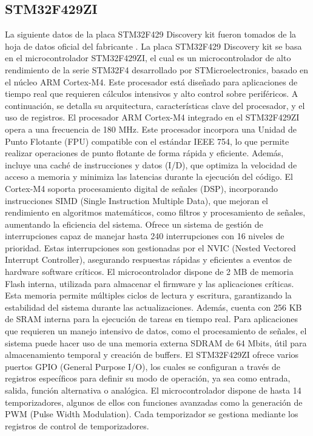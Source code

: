\subsection{STM32F429ZI}
La siguiente datos de la placa STM32F429 Discovery kit fueron tomados de la hoja de datos oficial del fabricante \cite{discovery}.
La placa STM32F429 Discovery kit se basa en el microcontrolador STM32F429ZI, el cual es un microcontrolador de alto rendimiento de la serie STM32F4 desarrollado por STMicroelectronics, basado en el núcleo ARM Cortex-M4. Este procesador está diseñado para aplicaciones de tiempo real que requieren cálculos intensivos y alto control sobre periféricos. A continuación, se detalla su arquitectura, características clave del procesador, y el uso de registros.
El procesador ARM Cortex-M4 integrado en el STM32F429ZI opera a una frecuencia de 180 MHz. Este procesador incorpora una Unidad de Punto Flotante (FPU) compatible con el estándar IEEE 754, lo que permite realizar operaciones de punto flotante de forma rápida y eficiente. Además, incluye una caché de instrucciones y datos (I/D), que optimiza la velocidad de acceso a memoria y minimiza las latencias durante la ejecución del código.
El Cortex-M4 soporta procesamiento digital de señales (DSP), incorporando instrucciones SIMD (Single Instruction Multiple Data), que mejoran el rendimiento en algoritmos matemáticos, como filtros y procesamiento de señales, aumentando la eficiencia del sistema. Ofrece un sistema de gestión de interrupciones capaz de manejar hasta 240 interrupciones con 16 niveles de prioridad. Estas interrupciones son gestionadas por el NVIC (Nested Vectored Interrupt Controller), asegurando respuestas rápidas y eficientes a eventos de hardware software críticos.
El microcontrolador dispone de 2 MB de memoria Flash interna, utilizada para almacenar el firmware y las aplicaciones críticas. Esta memoria permite múltiples ciclos de lectura y escritura, garantizando la estabilidad del sistema durante las actualizaciones. Además, cuenta con 256 KB de SRAM interna para la ejecución de tareas en tiempo real. Para aplicaciones que requieren un manejo intensivo de datos, como el procesamiento de señales, el sistema puede hacer uso de una memoria externa SDRAM de 64 Mbits, útil para almacenamiento temporal y creación de buffers.
El STM32F429ZI ofrece varios puertos GPIO (General Purpose I/O), los cuales se configuran a través de registros específicos para definir su modo de operación, ya sea como entrada, salida, función alternativa o analógica.
El microcontrolador dispone de hasta 14 temporizadores, algunos de ellos con funciones avanzadas como la generación de PWM (Pulse Width Modulation). Cada temporizador se gestiona mediante los registros de control de temporizadores.

